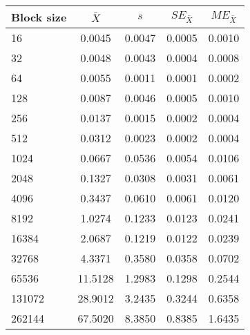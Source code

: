 \begin{tabular}{lcccc}\toprule
{\small Block size} & $\bar{X}$ & $s$ & $SE_{\bar{X}}$ & $ME_{\bar{X}}$ \\\midrule
16 & 0.0045 & 0.0047 & 0.0005 & 0.0010\\
32 & 0.0048 & 0.0043 & 0.0004 & 0.0008\\
64 & 0.0055 & 0.0011 & 0.0001 & 0.0002\\
128 & 0.0087 & 0.0046 & 0.0005 & 0.0010\\
256 & 0.0137 & 0.0015 & 0.0002 & 0.0004\\
512 & 0.0312 & 0.0023 & 0.0002 & 0.0004\\
1024 & 0.0667 & 0.0536 & 0.0054 & 0.0106\\
2048 & 0.1327 & 0.0308 & 0.0031 & 0.0061\\
4096 & 0.3437 & 0.0610 & 0.0061 & 0.0120\\
8192 & 1.0274 & 0.1233 & 0.0123 & 0.0241\\
16384 & 2.0687 & 0.1219 & 0.0122 & 0.0239\\
32768 & 4.3371 & 0.3580 & 0.0358 & 0.0702\\
65536 & 11.5128 & 1.2983 & 0.1298 & 0.2544\\
131072 & 28.9012 & 3.2435 & 0.3244 & 0.6358\\
262144 & 67.5020 & 8.3850 & 0.8385 & 1.6435\\
\bottomrule
\end{tabular}
